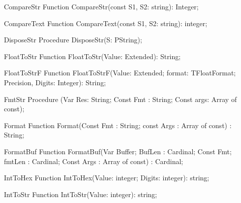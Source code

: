  
\begin{function}{CompareStr}
\Declaration
Function CompareStr(const S1, S2: string): Integer;
\Description
\Errors
\SeeAlso
\end{function}

 
\begin{function}{CompareText}
\Declaration
Function CompareText(const S1, S2: string): integer;
\Description
\Errors
\SeeAlso
\end{function}

 
\begin{procedure}{DisposeStr}
\Declaration
Procedure DisposeStr(S: PString);
\Description
\Errors
\SeeAlso
\end{procedure}

 
\begin{function}{FloatToStr}
\Declaration
Function FloatToStr(Value: Extended): String;
\Description
\Errors
\SeeAlso
\end{function}

 
\begin{function}{FloatToStrF}
\Declaration
Function FloatToStrF(Value: Extended; format: TFloatFormat; Precision, Digits: Integer): String;
\Description
\Errors
\SeeAlso
\end{function}

 
\begin{procedure}{FmtStr}
\Declaration
Procedure (Var Res: String; Const Fmt : String; Const args: Array of const);
\Description
\Errors
\SeeAlso
\end{procedure}

 
\begin{function}{Format}
\Declaration
Function Format(Const Fmt : String; const Args : Array of const) : String;
\Description
\Errors
\SeeAlso
\end{function}

 
\begin{function}{FormatBuf}
\Declaration
Function FormatBuf(Var Buffer; BufLen : Cardinal; Const Fmt; fmtLen : Cardinal; Const Args : Array of const) : Cardinal;
\Description
\Errors
\SeeAlso
\end{function}

 
\begin{function}{IntToHex}
\Declaration
Function IntToHex(Value: integer; Digits: integer): string;
\Description
\Errors
\SeeAlso
\end{function}

 
\begin{function}{IntToStr}
\Declaration
Function IntToStr(Value: integer): string;
\Description
\Errors
\SeeAlso
\end{function}

